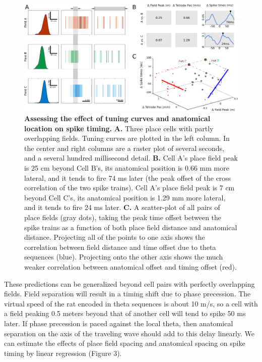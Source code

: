 \documentclass[]{article}
\begin{document}
\begin{figure}[htbp]
\centering
\includegraphics{./finalFigs/pairXCorr.png}
\caption{\textbf{Assessing the effect of tuning curves and anatomical location on spike timing.}
\textbf{A.} Three place cells with partly overlapping fields. Tuning
curves are plotted in the left column. In the center and right columns
are a raster plot of several seconds, and a several hundred millisecond
detail. \textbf{B.} Cell A's place field peak is 25 cm beyond Cell B's,
its anatomical position is 0.66 mm more lateral, and it tends to fire 74
ms later (the peak offset of the cross correlation of the two spike
trains). Cell A's place field peak is 7 cm beyond Cell C's, its
anatomical position is 1.29 mm more lateral, and it tends to fire 24 ms
later. \textbf{C.} A scatter-plot of all pairs of place fields (gray
dots), taking the peak time offset between the spike trains as a
function of both place field distance and anatomical distance.
Projecting all of the points to one axis shows the correlation between
field distance and time offset due to theta sequences (blue). Projecting
onto the other axis shows the much weaker correlation between anatomical
offset and timing offset (red).}
\end{figure}

These predictions can be generalized beyond cell pairs with perfectly
overlapping fields. Field separation will result in a timing shift due
to phase precession. The virtual speed of the rat encoded in theta
sequences is about 10 m/s, so a cell with a field peaking 0.5 meters
beyond that of another cell will tend to spike 50 ms later. If phase
precession is paced against the local theta, then anatomical separation
on the axis of the traveling wave should add to this delay linearly. We
can estimate the effects of place field spacing and anatomical spacing
on spike timing by linear regression (Figure 3).
\end{document}
